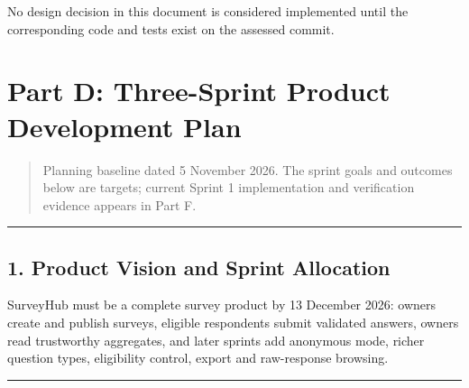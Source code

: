 \documentclass[12pt,a4paper]{article}
\begin{document}
No design decision in this document is considered implemented until the corresponding code and tests exist on the assessed commit.



\label{part-c-end}
\clearpage

\section{Part D: Three-Sprint Product Development Plan}

\label{part-d-start}


\begin{quote}
Planning baseline dated 5 November 2026. The sprint goals and outcomes below are targets; current Sprint 1 implementation and verification evidence appears in Part F.

\end{quote}

\medskip\noindent\rule{\linewidth}{0.4pt}\medskip

\subsection*{1. Product Vision and Sprint Allocation}
SurveyHub must be a complete survey product by 13 December 2026: owners create and publish surveys, eligible respondents submit validated answers, owners read trustworthy aggregates, and later sprints add anonymous mode, richer question types, eligibility control, export and raw-response browsing.



\medskip\noindent\rule{\linewidth}{0.4pt}\medskip

\end{document}
